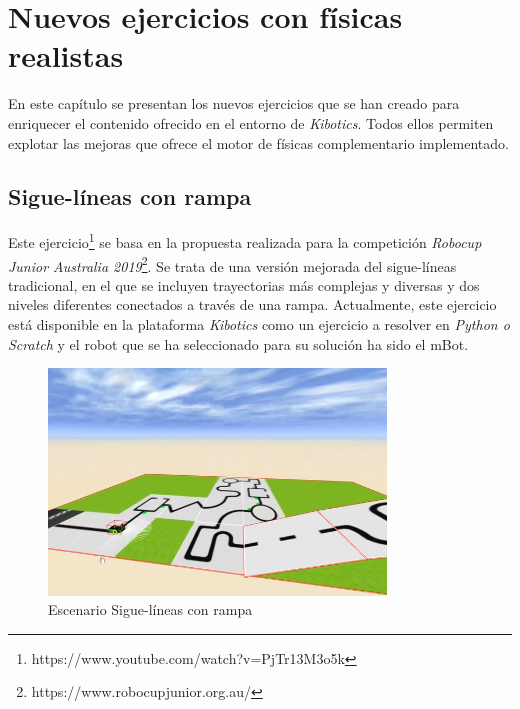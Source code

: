 \chapter{Nuevos ejercicios con físicas realistas}
\label{chap:nuevos_ejercicios} 
En este capítulo se presentan los nuevos ejercicios que se han creado para enriquecer el contenido ofrecido en el entorno de \textit{Kibotics}. Todos ellos permiten explotar las mejoras que ofrece el motor de físicas complementario implementado.

\section{Sigue-líneas con rampa}
Este ejercicio\footnote{https://www.youtube.com/watch?v=PjTr13M3o5k} se basa en la propuesta realizada para la competición \textit{Robocup Junior Australia 2019}\footnote{https://www.robocupjunior.org.au/}. Se trata de una versión mejorada del sigue-líneas tradicional, en el que se incluyen trayectorias más complejas y diversas y dos niveles diferentes conectados a través de una rampa. Actualmente, este ejercicio está disponible en la plataforma \textit{Kibotics} como un ejercicio a resolver en \textit{Python o Scratch} y el robot que se ha seleccionado para su solución ha sido el mBot.  

\newpage

\begin{figure}[h!]
    \centering
    \includegraphics[width=0.8\textwidth, height=0.8\textwidth]{siguelineas.png}
    \caption{Escenario Sigue-líneas con rampa}
    \label{fig:Sigue-líneas con rampa 2}
\end{figure}

